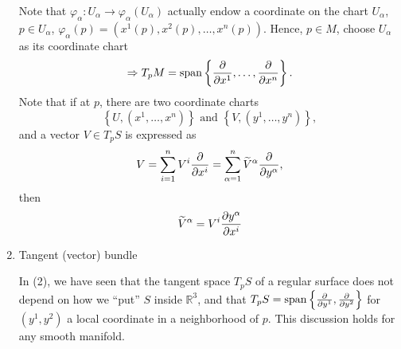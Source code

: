 \begin{enumerate}[(1)]
\begin{remark}
\begin{center}
\begin{tikzpicture}[x=0.75pt,y=0.75pt,yscale=-1,xscale=1]
\end{tikzpicture}
        \end{center}
        Note that \(\varphi_\alpha\colon U_\alpha \to \varphi_\alpha
        \left(U_\alpha\right)\) actually endow a coordinate on the chart
         \(U_\alpha\), \ie\ \(p\in U_\alpha\), \(\varphi_\alpha(p)
         =\left(x^1(p),x^2(p),\ldots,x^n(p)\right).
         \)
         Hence, \(p\in M\), choose \(U_\alpha\) as its coordinate chart
         \[
            \Rightarrow T_p M=\Span\left\{\pdv{x^1},\ldots,\pdv{x^n}
            \right\}.
         \]
         Note that if at \(p\), there are two coordinate charts
         \[
             \left\lbrace U,\left(x^1,\ldots,x^n\right)\right\rbrace
             \text{ and } 
             \left\lbrace V,\left(y^1,\ldots,y^n\right)\right\rbrace,
         \]
         and a vector \(V\in T_p S\) is expressed as 
         \[
            V=\sum_{i=1}^n V^i\pdv{x^i}=\sum_{\alpha=1}^n 
            \widetilde{V}^\alpha \pdv{y^\alpha}   
         ,\]
         then 
         \[
                \widetilde{V}^\alpha=V^i\pdv{y^\alpha}{x^i}
            \]
    \end{remark}
    \item Tangent (vector) bundle
    
    In (2), we have seen that the tangent space \(T_p S\) of a regular 
    surface does not depend on how we ``put'' \(S\) inside 
    \(\mathbb{R}^3\), and that \(T_p S=\Span\left\{\pdv{y^1},\pdv{y^2}
    \right\}\) for \(\left(y^1,y^2\right)\) a local coordinate in a 
    neighborhood of \(p\). This discussion holds for any smooth manifold.


\end{enumerate}
